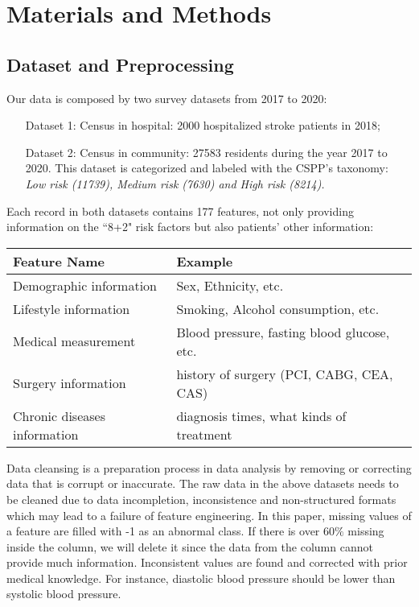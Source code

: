 \documentclass{article}
\begin{document}
\section{Materials and Methods}\label{sec:data-description}



\subsection{Dataset and Preprocessing}
 Our data is composed by two  survey datasets from 2017 to 2020:
\begin{itemize}[leftmargin=50pt]
    \setlength{\itemsep}{0pt}
    \setlength{\parsep}{0pt}
    \setlength{\parskip}{0pt}
    \item[Dataset 1:] Census in hospital: 2000 hospitalized stroke patients in 2018;
    \item[Dataset 2:] Census in community: 27583 residents during the year 2017 to 2020. This dataset is categorized and labeled with the CSPP's taxonomy: 
    \textit{Low risk (11739), Medium risk (7630) and High risk (8214).}
\end{itemize}


Each record in both datasets contains 177 features, not only providing information on the ``8+2" risk factors but also patients' other information:
\begin{table}[H]
\small
\centering
\begin{tabular}{ll}
\hline
\textbf{Feature   Name}      & \textbf{Example}                            \\ \hline
Demographic information      & Sex, Ethnicity, etc.                        \\
Lifestyle information        & Smoking, Alcohol consumption, etc.          \\
Medical measurement          & Blood pressure, fasting blood glucose, etc. \\
Surgery information          & history of surgery (PCI, CABG, CEA, CAS)    \\
Chronic diseases information & diagnosis times, what kinds of treatment    \\ \hline
\end{tabular}
\end{table}


 Data cleansing is a preparation process in data analysis by removing or correcting data that is corrupt or inaccurate.  The raw data in the above datasets needs to be cleaned due to data incompletion, inconsistence and non-structured formats which may lead to a failure of feature engineering. In this paper, missing values of a feature are filled with -1 as an abnormal class.  If there is over $60\%$ missing inside the column, we will delete it since the data from the column cannot provide much information.  Inconsistent values are found and corrected with prior medical knowledge. For instance, diastolic blood pressure should be lower than systolic blood pressure.  
 
\end{document}
